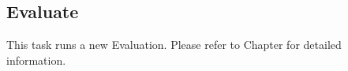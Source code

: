 
\subsection{Evaluate}
\label{sec:ui_proc_evaluate}

This task runs a new Evaluation. Please refer to Chapter  for detailed information.
